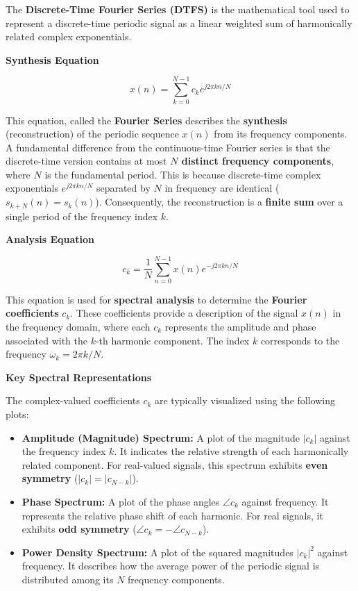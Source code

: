 The \textbf{Discrete-Time Fourier Series (DTFS)} is the mathematical
tool used to represent a discrete-time periodic signal as a linear
weighted sum of harmonically related complex exponentials.

\textbf{Synthesis Equation}

\[x(n) = \sum_{k=0}^{N-1} c_k e^{j2\pi kn/N}\]

This equation, called the \textbf{Fourier Series} describes the
\textbf{synthesis} (reconstruction) of the periodic sequence \(x(n)\)
from its frequency components. A fundamental difference from the
continuous-time Fourier series is that the discrete-time version
contains at most \textbf{\(N\) distinct frequency components}, where
\(N\) is the fundamental period. This is because discrete-time complex
exponentials \({e^{j2\pi kn/N}}\) separated by \(N\) in frequency are
identical (\(s_{k+N}(n) = s_k(n)\)). Consequently, the reconstruction is
a \textbf{finite sum} over a single period of the frequency index \(k\).

\textbf{Analysis Equation}

\[c_k = \frac{1}{N} \sum_{n=0}^{N-1} x(n) e^{-j2\pi kn/N}\]

This equation is used for \textbf{spectral analysis} to determine the
\textbf{Fourier coefficients} \({c_k}\). These coefficients provide a
description of the signal \(x(n)\) in the frequency domain, where each
\(c_k\) represents the amplitude and phase associated with the \(k\)-th
harmonic component. The index \(k\) corresponds to the frequency
\(\omega_k = 2\pi k/N\).

\textbf{Key Spectral Representations}

The complex-valued coefficients \({c_k}\) are typically visualized using
the following plots:

\begin{itemize}
\tightlist
\item
  \textbf{Amplitude (Magnitude) Spectrum:} A plot of the magnitude
  \textbf{\(|c_k|\)} against the frequency index \(k\). It indicates the
  relative strength of each harmonically related component. For
  real-valued signals, this spectrum exhibits \textbf{even symmetry}
  (\(|c_k| = |c_{N-k}|\)).
\item
  \textbf{Phase Spectrum:} A plot of the phase angles
  \textbf{\(\angle c_k\)} against frequency. It represents the relative
  phase shift of each harmonic. For real signals, it exhibits
  \textbf{odd symmetry} (\(\angle c_k = -\angle c_{N-k}\)).
\item
  \textbf{Power Density Spectrum:} A plot of the squared magnitudes
  \textbf{\(|c_k|^2\)} against frequency. It describes how the average
  power of the periodic signal is distributed among its \(N\) frequency
  components.
\end{itemize}


